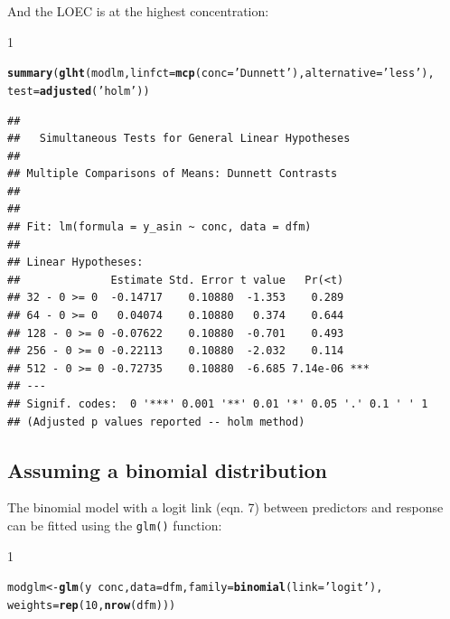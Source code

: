 \documentclass{scrartcl}\usepackage[]{graphicx}\usepackage[]{color}
\makeatletter
\newcommand{\hlnum}[1]{\textcolor[rgb]{0.686,0.059,0.569}{#1}}%
\newcommand{\hlstr}[1]{\textcolor[rgb]{0.192,0.494,0.8}{#1}}%
\newcommand{\hlopt}[1]{\textcolor[rgb]{0,0,0}{#1}}%
\newcommand{\hlstd}[1]{\textcolor[rgb]{0.345,0.345,0.345}{#1}}%
\newcommand{\hlkwb}[1]{\textcolor[rgb]{0.69,0.353,0.396}{#1}}%
\newcommand{\hlkwc}[1]{\textcolor[rgb]{0.333,0.667,0.333}{#1}}%
\newcommand{\hlkwd}[1]{\textcolor[rgb]{0.737,0.353,0.396}{\textbf{#1}}}%
\newenvironment{kframe}{%
 \def\at@end@of@kframe{}%
 \ifinner\ifhmode%
  \def\at@end@of@kframe{\end{minipage}}%
  \begin{minipage}{\columnwidth}%
 \fi\fi%
 \def\FrameCommand##1{\hskip\@totalleftmargin \hskip-\fboxsep
 \colorbox{shadecolor}{##1}\hskip-\fboxsep
     \hskip-\linewidth \hskip-\@totalleftmargin \hskip\columnwidth}%
 \MakeFramed {\advance\hsize-\width
   \@totalleftmargin\z@ \linewidth\hsize
   \@setminipage}}%
 {\par\unskip\endMakeFramed%
 \at@end@of@kframe}
\newenvironment{knitrout}{}{} %
\renewenvironment{knitrout}{\begin{spacing}{1}}{\end{spacing}}
\makeatother
\begin{document}
And the LOEC is at the highest concentration:
\begin{knitrout}
\color{fgcolor}\begin{kframe}
\begin{alltt}
\hlkwd{summary}\hlstd{(}\hlkwd{glht}\hlstd{(modlm,} \hlkwc{linfct} \hlstd{=} \hlkwd{mcp}\hlstd{(}\hlkwc{conc} \hlstd{=} \hlstr{'Dunnett'}\hlstd{),} \hlkwc{alternative} \hlstd{=} \hlstr{'less'}\hlstd{),}
        \hlkwc{test} \hlstd{=} \hlkwd{adjusted}\hlstd{(}\hlstr{'holm'}\hlstd{))}
\end{alltt}
\begin{verbatim}
## 
## 	 Simultaneous Tests for General Linear Hypotheses
## 
## Multiple Comparisons of Means: Dunnett Contrasts
## 
## 
## Fit: lm(formula = y_asin ~ conc, data = dfm)
## 
## Linear Hypotheses:
##              Estimate Std. Error t value   Pr(<t)    
## 32 - 0 >= 0  -0.14717    0.10880  -1.353    0.289    
## 64 - 0 >= 0   0.04074    0.10880   0.374    0.644    
## 128 - 0 >= 0 -0.07622    0.10880  -0.701    0.493    
## 256 - 0 >= 0 -0.22113    0.10880  -2.032    0.114    
## 512 - 0 >= 0 -0.72735    0.10880  -6.685 7.14e-06 ***
## ---
## Signif. codes:  0 '***' 0.001 '**' 0.01 '*' 0.05 '.' 0.1 ' ' 1
## (Adjusted p values reported -- holm method)
\end{verbatim}
\end{kframe}
\end{knitrout}


\subsection{Assuming a binomial distribution}
The binomial model with a logit link (eqn. 7) between predictors and response can be fitted using the \texttt{glm()} function:
\begin{knitrout}
\color{fgcolor}\begin{kframe}
\begin{alltt}
\hlstd{modglm} \hlkwb{<-} \hlkwd{glm}\hlstd{(y} \hlopt{~} \hlstd{conc ,} \hlkwc{data} \hlstd{= dfm,} \hlkwc{family} \hlstd{=} \hlkwd{binomial}\hlstd{(}\hlkwc{link} \hlstd{=} \hlstr{'logit'}\hlstd{),}
              \hlkwc{weights} \hlstd{=} \hlkwd{rep}\hlstd{(}\hlnum{10}\hlstd{,} \hlkwd{nrow}\hlstd{(dfm)))}
\end{alltt}
\end{kframe}
\end{knitrout}
\end{document}
